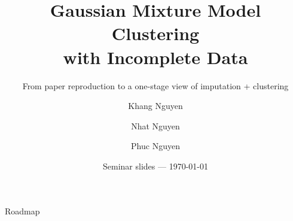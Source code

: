 \documentclass[aspectratio=169, 11pt, xcolor=table]{beamer}
\title[\textbf{GMM with Incomplete Data}]{
    \textbf{Gaussian Mixture Model Clustering\\with Incomplete Data}
}
\subtitle{From paper reproduction to a one-stage view of imputation + clustering}
\author[HCMUS Seminar]{Khang Nguyen \and Nhat Nguyen \and Phuc Nguyen}
\institute[HCMUS]{
    \small Master of Data Science\\University of Science, VNU-HCM
}
\date{\small Seminar slides --- \today}
\begin{document}
\begin{frame}[plain]
    \titlepage
\end{frame}

\begin{frame}{Roadmap}
    \tableofcontents[hideallsubsections]
\end{frame}







\end{document}
